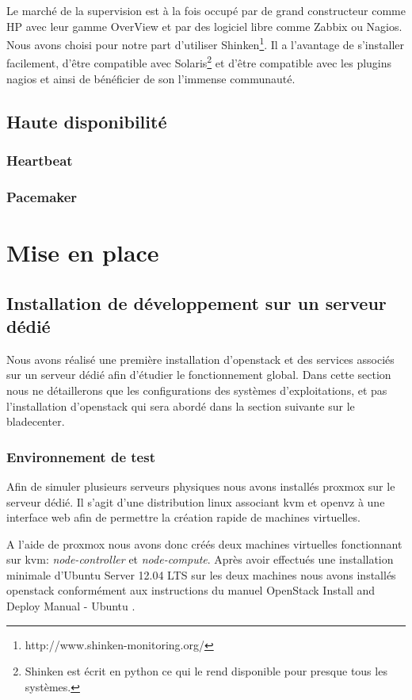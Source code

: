 \documentclass[a4paper,oneside]{report}
\begin{document}
Le marché de la supervision est à la fois occupé par de grand constructeur comme HP avec leur gamme OverView et par des logiciel libre comme Zabbix ou Nagios.
Nous avons choisi pour notre part d'utiliser Shinken\footnote{http://www.shinken-monitoring.org/}.
Il a l'avantage de s'installer facilement, d'être compatible avec Solaris\footnote{Shinken est écrit en python ce qui le rend disponible pour presque tous les systèmes.} et d'être compatible avec les plugins nagios et ainsi de bénéficier de son l'immense communauté.

\section{Haute disponibilité}
\subsection{Heartbeat}

\subsection{Pacemaker}

\chapter{Mise en place} \label{cha:miseenplace}
\section{Installation de développement sur un serveur dédié}
Nous avons réalisé une première installation d'\gls{openstack} et des services associés sur un serveur dédié afin d'étudier le fonctionnement global.
Dans cette section nous ne détaillerons que les configurations des systèmes d'exploitations, et pas l'installation d'\gls{openstack} qui sera abordé dans la section suivante sur le \gls{bladecenter}.

\subsection{Environnement de test}
Afin de simuler plusieurs serveurs physiques nous avons installés \gls{proxmox} sur le serveur dédié. Il s'agit d'une distribution \gls{linux} associant \gls{kvm} et \gls{openvz} à une interface web afin de permettre la création rapide de machines virtuelles.

A l'aide de \gls{proxmox} nous avons donc créés deux machines virtuelles fonctionnant sur \gls{kvm}: \emph{node-controller} et \emph{node-compute}. Après avoir effectués une installation minimale d'Ubuntu Server 12.04 LTS sur les deux machines nous avons installés \gls{openstack} conformément aux instructions du manuel \og OpenStack Install and Deploy Manual - Ubuntu \fg \cite{OSFolsomInstallUbuntu1210}.
\end{document}

